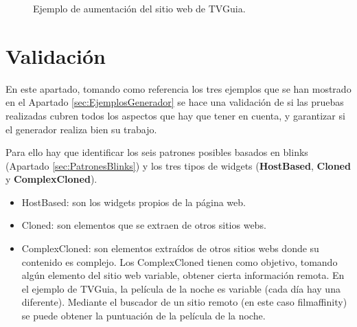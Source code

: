 \begin{figure}
\centering
{}
\caption{Ejemplo de aumentación del sitio web de TVGuia.}
\label{fig:TVGuiaExample}
\end{figure}

\section{Validación}
\label{sec:ValidacionGenerador}

En este apartado, tomando como referencia los tres ejemplos que se han mostrado en el Apartado \ref{sec:EjemplosGenerador} se hace una validación de si las pruebas realizadas cubren todos los aspectos que hay que tener en cuenta, y garantizar si el generador realiza bien su trabajo.

Para ello hay que identificar los seis patrones posibles basados en blinks (Apartado \ref{sec:PatronesBlinks}) y los tres tipos de widgets (\textbf{HostBased}, \textbf{Cloned} y \textbf{ComplexCloned}).
\begin{itemize}
\item{HostBased: son los widgets propios de la página web.}
\item{Cloned: son elementos que se extraen de otros sitios webs.}
\item{ComplexCloned: son elementos extraídos de otros sitios webs donde su contenido es complejo. Los ComplexCloned tienen como objetivo, tomando algún elemento del sitio web variable, obtener cierta información remota. En el ejemplo de TVGuia, la película de la noche es variable (cada día hay una diferente). Mediante el buscador de un sitio remoto (en este caso filmaffinity) se puede obtener la puntuación de la película de la noche.}
\end{itemize}

